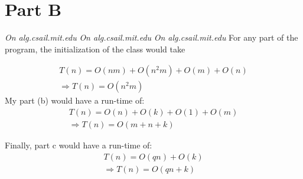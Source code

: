 \documentclass[12pt,twoside]{article}
\begin{document}
\begin{problems}
\begin{problemparts}
\begin{enumerate}
\end{enumerate}

\end{problemparts}

\section*{Part B}

\problem
\begin{problemparts}
\problempart \emph{On alg.csail.mit.edu}
\problempart \emph{On alg.csail.mit.edu}
\problempart \emph{On alg.csail.mit.edu}
\problempart 
For any part of the program, the initialization of the class would take 

\begin{align}
T(n)=O(nm)+O(n^2m)+O(m)+O(n) \\ \Rightarrow T(n)=O(n^2m)
\end{align}
My part (b) would have a run-time of:
\begin{align}
T(n)=O(n)+O(k)+O(1)+O(m) \\ \Rightarrow T(n)=O(m+n+k)
\end{align}

Finally, part c would have a run-time of:
\begin{align}
T(n)=O(qn)+O(k) \\ \Rightarrow T(n)=O(qn+k)
\end{align}


\end{problemparts}
\end{problems}
\end{document}
